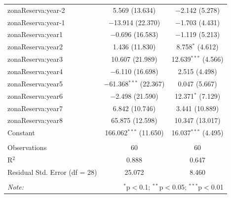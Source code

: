 \documentclass[]{article}
\begin{document}
\begin{table}[!htbp]
\begin{tabular}{@{\extracolsep{1pt}}lcc}
  zonaReserva:year-2 & 5.569 (13.634) & $-$2.142 (5.278) \\ 
  zonaReserva:year-1 & $-$13.914 (22.370) & $-$1.703 (4.431) \\ 
  zonaReserva:year1 & $-$0.696 (16.583) & $-$1.119 (5.213) \\ 
  zonaReserva:year2 & 1.436 (11.830) & 8.758$^{*}$ (4.612) \\ 
  zonaReserva:year3 & 10.607 (21.989) & 12.639$^{***}$ (4.566) \\ 
  zonaReserva:year4 & $-$6.110 (16.698) & 2.515 (4.498) \\ 
  zonaReserva:year5 & $-$61.368$^{***}$ (22.367) & 0.047 (5.667) \\ 
  zonaReserva:year6 & $-$2.498 (21.590) & 12.371$^{*}$ (7.129) \\ 
  zonaReserva:year7 & 6.842 (10.746) & 3.441 (10.889) \\ 
  zonaReserva:year8 & 65.875 (12.598) & 10.347 (13.017) \\ 
  Constant & 166.062$^{***}$ (11.650) & 16.037$^{***}$ (4.495) \\ 
 \hline \\[-1.8ex] 
Observations & 60 & 60 \\ 
R$^{2}$ & 0.888 & 0.647 \\ 
Residual Std. Error (df = 28) & 25.072 & 8.460 \\ 
\hline 
\hline \\[-1.8ex] 
\textit{Note:}  & \multicolumn{2}{r}{$^{*}$p$<$0.1; $^{**}$p$<$0.05; $^{***}$p$<$0.01} \\ 
\end{tabular} 
\end{table}
\end{document}
